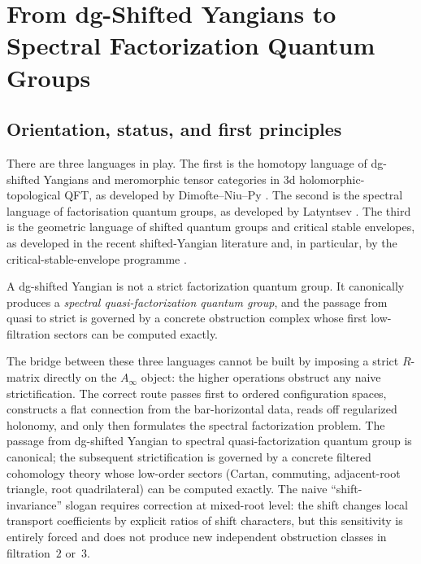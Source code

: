 \chapter{From dg-Shifted Yangians to Spectral Factorization Quantum Groups}
\label{v1-chap:dg-shifted-factorization}

\section{Orientation, status, and first principles}

There are three languages in play.
The first is the homotopy language of dg-shifted Yangians and
meromorphic tensor categories in 3d holomorphic-topological QFT,
as developed by Dimofte--Niu--Py \cite{DNP25}.
The second is the spectral language of factorisation quantum groups,
as developed by Latyntsev \cite{Latyntsev23}.
The third is the geometric language of shifted quantum groups and
critical stable envelopes, as developed in the recent shifted-Yangian
literature and, in particular, by the critical-stable-envelope
programme \cite{COZZ26}.

A dg-shifted Yangian is not a strict factorization quantum group.
It canonically produces a \emph{spectral quasi-factorization quantum
group}, and the passage from quasi to strict is governed by a concrete
obstruction complex whose first low-filtration sectors can be computed
exactly.

The bridge between these three languages cannot be built by imposing a
strict $R$-matrix directly on the $A_\infty$ object: the higher
operations obstruct any naive strictification. The correct route
passes first to ordered configuration spaces, constructs a flat
connection from the bar-horizontal data, reads off regularized
holonomy, and only then formulates the spectral factorization problem.
The passage from dg-shifted Yangian to spectral quasi-factorization
quantum group is canonical; the subsequent strictification is governed
by a concrete filtered cohomology theory whose low-order sectors
(Cartan, commuting, adjacent-root triangle, root quadrilateral) can be
computed exactly. The naive ``shift-invariance'' slogan requires
correction at mixed-root level: the shift changes local transport
coefficients by explicit ratios of shift characters, but this
sensitivity is entirely forced and does not produce new independent
obstruction classes in filtration~$2$ or~$3$.

